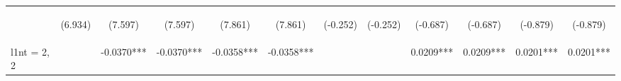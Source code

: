 \documentclass[]{article}
\begin{document}
\begin{center}
\begin{tabular}{lccccccccccc}
        \vspace{4pt}     & \begin{footnotesize}(6.934)\end{footnotesize}  & \begin{footnotesize}(7.597)\end{footnotesize}  & \begin{footnotesize}(7.597)\end{footnotesize}  & \begin{footnotesize}(7.861)\end{footnotesize}  & \begin{footnotesize}(7.861)\end{footnotesize}  & \begin{footnotesize}(-0.252)\end{footnotesize}  & \begin{footnotesize}(-0.252)\end{footnotesize}  & \begin{footnotesize}(-0.687)\end{footnotesize} & \begin{footnotesize}(-0.687)\end{footnotesize} & \begin{footnotesize}(-0.879)\end{footnotesize} & \begin{footnotesize}(-0.879)\end{footnotesize} \\
        l1nt = 2, 2      &                                                & -0.0370***                                     & -0.0370***                                     & -0.0358***                                     & -0.0358***                                     &                                                 &                                                 & 0.0209***                                      & 0.0209***                                      & 0.0201***                                      & 0.0201***                                      \\

\end{tabular}
\end{center}
\end{document}
